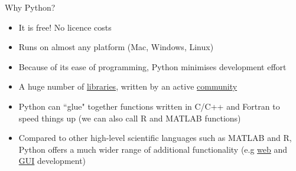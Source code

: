 \documentclass[xcolor=table,aspectratio=169]{beamer}
\begin{document}
\begin{frame}{Why Python?}

\begin{itemize}\addtolength{\itemsep}{0.5\baselineskip}
	\item<1-> It is free! No licence costs
	\item<2-> Runs on almost any platform (Mac, Windows, Linux)
	\item<3-> Because of its ease of programming, Python minimises development effort
	\item<4-> A huge number of \href{https://pypi.python.org/pypi}{libraries}, written by an active \href{https://www.python.org/community/}{community}  
	\item<5-> Python can ``glue" together functions written in C/C++ and Fortran to speed things up (we can also call R and MATLAB functions)
	\item<6-> Compared to other high-level scientific languages such as MATLAB and R, Python offers a much wider range of additional functionality (e.g \href{https://www.djangoproject.com/}{web} and \href{https://wiki.python.org/moin/TkInter}{GUI} development) %
\end{itemize}

\end{frame}
\end{document}
